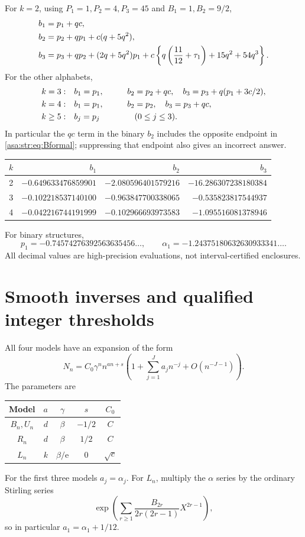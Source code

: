 \documentclass[11pt,letterpaper]{article}
\theoremstyle{remark}\newtheorem{remark}[theorem]{Remark}
\numberwithin{equation}{section}
\newcommand{\ee}{\mathrm e}
\begin{document}
For $k=2$, using $P_1=1,P_2=4,P_3=45$ and $B_1=1,B_2=9/2$,
\begin{align}
 b_1&=p_1+qc,\notag\\
 b_2&=p_2+qp_1+c(q+5q^2),\label{asa:str:eq:b23binary}\\
 b_3&=p_3+qp_2+(2q+5q^2)p_1
 +c\left\{q\left(\frac{11}{12}+\tau_1\right)+15q^2+54q^3\right\}.\notag
\end{align}
For the other alphabets,
\begin{alignat}{2}
 k=3:\quad&b_1=p_1,&\qquad b_2&=p_2+qc,
 \quad b_3=p_3+q(p_1+3c/2),\notag\\
 k=4:\quad&b_1=p_1,& b_2&=p_2,
 \quad b_3=p_3+qc,\label{asa:str:eq:b23other}\\
 k\ge5:\quad&b_j=p_j&&(0\le j\le3).\notag
\end{alignat}
In particular the $qc$ term in the binary $b_2$ includes the opposite endpoint in \eqref{asa:str:eq:Bformal}; suppressing that endpoint also gives an incorrect answer.

\begin{center}\small
\begin{tabular}{rrrr}
\toprule
$k$&$b_1$&$b_2$&$b_3$\\
\midrule
2&$-0.649633476859901$&$-2.080596401579216$&$-16.286307238180384$\\
3&$-0.102218537140100$&$-0.963847700338065$&$-0.535823817544937$\\
4&$-0.042216744191999$&$-0.102966693973583$&$-1.095516081378946$\\
\bottomrule
\end{tabular}
\end{center}
For binary structures,
\[
 p_1=-0.74574276392563635456\ldots,\qquad
 \alpha_1=-1.24375180632630933341\ldots.
\]
All decimal values are high-precision evaluations, not interval-certified enclosures.

\section{Smooth inverses and qualified integer thresholds}\label{asa:str:sec:inverse}
All four models have an expansion of the form
\begin{equation}\label{asa:str:eq:generalmodel}
 N_n=C_0\gamma^nn^{an+s}
 \left(1+\sum_{j=1}^J a_jn^{-j}+O(n^{-J-1})\right).
\end{equation}
The parameters are
\begin{center}\small
\begin{tabular}{ccccc}
\toprule
Model&$a$&$\gamma$&$s$&$C_0$\\
\midrule
$B_n,U_n$&$d$&$\beta$&$-1/2$&$C$\\
$R_n$&$d$&$\beta$&$1/2$&$C$\\
$L_n$&$k$&$\beta/\ee$&$0$&$\sqrt c$\\
\bottomrule
\end{tabular}
\end{center}
For the first three models $a_j=\alpha_j$. For $L_n$, multiply the $\alpha$ series by the ordinary Stirling series
\[
 \exp\left(\sum_{r\ge1}\frac{B_{2r}}{2r(2r-1)}X^{2r-1}\right),
\]
so in particular $a_1=\alpha_1+1/12$.
\end{document}
